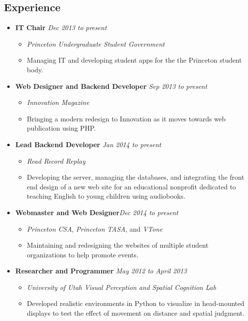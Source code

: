 \documentclass[11pt]{article}
\begin{document}
\subsection*{\textbf{Experience}}

\begin{itemize}[nolistsep,topsep=0pt, label=]
\itemsep0.33em
\item \textbf{IT Chair}  \hfill \emph{Dec 2013 to present}
\begin{itemize}[nolistsep,topsep=0pt, label=]
\item \emph{Princeton Undergraduate Student Government} 
\item Managing IT and developing student apps for the the Princeton student body.
\end{itemize}

\item \textbf{Web Designer and Backend Developer} \hfill\emph{Sep 2013 to present}
\begin{itemize}[nolistsep,topsep=0pt, label=]
\item \emph{Innovation Magazine}  
\item Bringing a modern redesign to Innovation as it moves towards web publication using PHP.
\end{itemize}

\item \textbf{Lead Backend Developer}  \hfill\emph{Jan 2014 to present}
\begin{itemize}[nolistsep,topsep=0pt, label=]
\item \emph{Read Record Replay}
\item Developing the server, managing the databases, and integrating the front end design of a new web site for an educational nonprofit dedicated to teaching English to young children using audiobooks.
\end{itemize}

\item \textbf{Webmaster and Web Designer}\hfill \emph{Dec 2014 to present}
\begin{itemize}[nolistsep,topsep=0pt, label=]
\item \emph{Princeton CSA}, \emph{Princeton TASA}, and \emph{VTone}
\item Maintaining and redesigning the websites of multiple student organizations to help promote events.
\end{itemize}

\item \textbf{Researcher and Programmer} \hfill\emph{May 2012 to April 2013}
\begin{itemize}[nolistsep,topsep=0pt, label=]
\item \emph{University of Utah Visual Perception and Spatial Cognition Lab}
\item Developed realistic environments in Python to visualize in head-mounted displays to test the effect of movement on distance and spatial judgment.\end{itemize}


\end{itemize}
\end{document}
